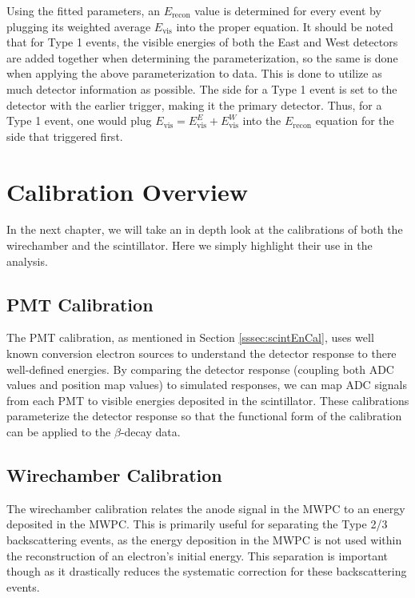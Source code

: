 Using the fitted parameters, an $E_{\mathrm{recon}}$ value is determined
for every event by plugging its weighted average $E_{\mathrm{vis}}$ into the proper equation.
It should be noted that for Type 1 events, the visible energies of both the East and West
detectors are added together when determining the parameterization, so
the same is done when applying the above parameterization to data. This is done to utilize as much
detector information as possible. The side for a Type 1 event is set to
the detector with the earlier trigger, making it the primary detector.
Thus, for a Type 1
event, one would plug $E_{\mathrm{vis}} = E_{\mathrm{vis}}^E + E_{\mathrm{vis}}^W$ into the $E_{\mathrm{recon}}$
equation for the side that triggered first.




\section{Calibration Overview}

In the next chapter, we will take an in depth look at the calibrations of both
the wirechamber and the scintillator. Here we simply highlight their use in the analysis.

\subsection{PMT Calibration} \label{ssec:PMTCal}

The PMT calibration, as mentioned in Section \ref{sssec:scintEnCal},
uses well known conversion electron sources
to understand the detector response to there well-defined energies. By comparing the detector
response (coupling both ADC values and position map values) to simulated responses,
we can map ADC signals from each PMT to visible energies deposited
in the scintillator. These calibrations parameterize the detector response so that the
functional form of the calibration can be applied to the $\beta$-decay data.

\subsection{Wirechamber Calibration}

The wirechamber calibration relates the anode signal in the MWPC to an energy deposited in the MWPC. This is
primarily useful for separating the Type 2/3 backscattering events, as the
energy deposition in the MWPC is not used within the reconstruction of an electron's initial
energy. This separation is important though as it drastically reduces the systematic
correction for these backscattering events.
 

